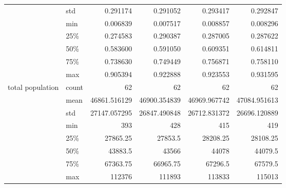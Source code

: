 \documentclass{article}
\begin{document}
\begin{tabular}{llrrrr}
\\           & std &       0.291174 &       0.291052 &       0.293417 &       0.292847 \\           & min &       0.006839 &       0.007517 &       0.008857 &       0.008296 \\           & 25\% &       0.274583 &       0.290387 &       0.287005 &       0.287622 \\           & 50\% &       0.583600 &       0.591050 &       0.609351 &       0.614811 \\           & 75\% &       0.738630 &       0.749449 &       0.756871 &       0.758110 \\           & max &       0.905394 &       0.922888 &       0.923553 &       0.931595 \\total population & count &      62 &      62 &      62 &      62 \\           & mean &   46861.516129 &   46900.354839 &   46969.967742 &   47084.951613 \\           & std &   27147.057295 &   26847.490848 &   26712.831372 &   26696.120889 \\           & min &     393 &     428 &     415 &     419 \\           & 25\% &   27865.25 &   27853.5 &   28208.25 &   28108.25 \\           & 50\% &   43883.5 &   43566 &   44078 &   44079.5 \\           & 75\% &   67363.75 &   66965.75 &   67296.5 &   67579.5 \\           & max &  112376 &  111893 &  113833 &  115013 \\
\bottomrule
\end{tabular}
\end{document}
